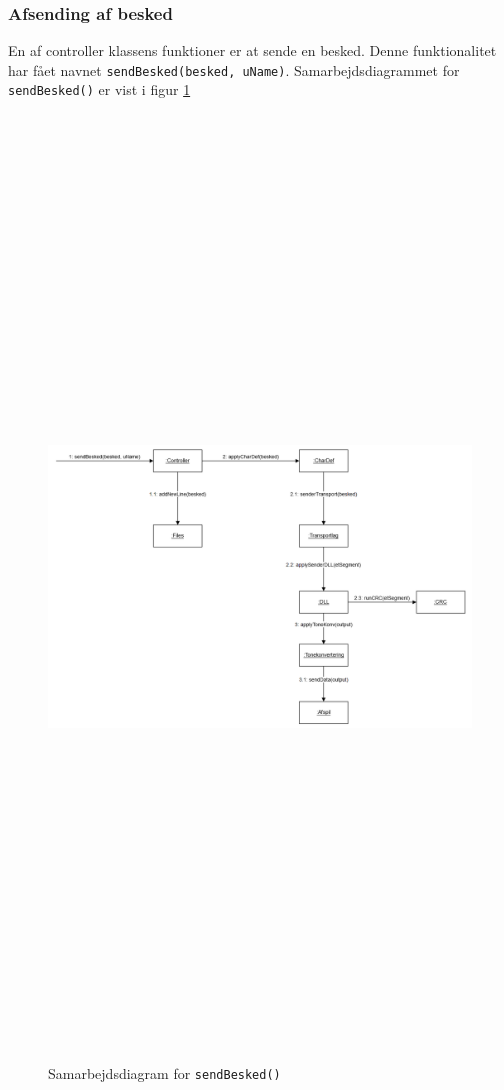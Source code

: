 \subsubsection{Afsending af besked}
En af controller klassens funktioner er at sende en besked. Denne funktionalitet har fået navnet \texttt{sendBesked(besked, uName)}. Samarbejdsdiagrammet for \texttt{sendBesked()} er vist i figur \ref{fig:sdsend}
\begin{figure}[ht]
	\centering
	\includegraphics[width=15cm,height=25cm,keepaspectratio]{pictures/SDsend.png}
	\caption{Samarbejdsdiagram for \texttt{sendBesked()}}
	\label{fig:sdsend}
\end{figure}

